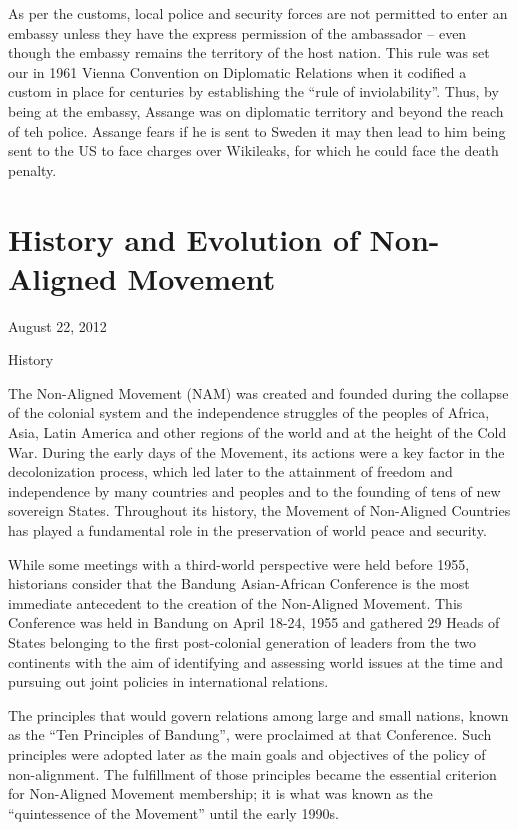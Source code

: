 \documentclass[
  openany]{book}
\begin{document}
As per the customs, local police and security forces are not permitted to enter an embassy unless they have the express permission of the ambassador -- even though the embassy remains the territory of the host nation. This rule was set our in 1961 Vienna Convention on Diplomatic Relations when it codified a custom in place for centuries by establishing the ``rule of inviolability''. Thus, by being at the embassy, Assange was on diplomatic territory and beyond the reach of teh police. Assange fears if he is sent to Sweden it may then lead to him being sent to the US to face charges over Wikileaks, for which he could face the death penalty.

\hypertarget{history-and-evolution-of-non-aligned-movement}{%
\section{History and Evolution of Non-Aligned Movement}\label{history-and-evolution-of-non-aligned-movement}}

August 22, 2012

History

The Non-Aligned Movement (NAM) was created and founded during the collapse of the colonial system and the independence struggles of the peoples of Africa, Asia, Latin America and other regions of the world and at the height of the Cold War. During the early days of the Movement, its actions were a key factor in the decolonization process, which led later to the attainment of freedom and independence by many countries and peoples and to the founding of tens of new sovereign States. Throughout its history, the Movement of Non-Aligned Countries has played a fundamental role in the preservation of world peace and security.

While some meetings with a third-world perspective were held before 1955, historians consider that the Bandung Asian-African Conference is the most immediate antecedent to the creation of the Non-Aligned Movement. This Conference was held in Bandung on April 18-24, 1955 and gathered 29 Heads of States belonging to the first post-colonial generation of leaders from the two continents with the aim of identifying and assessing world issues at the time and pursuing out joint policies in international relations.

The principles that would govern relations among large and small nations, known as the ``Ten Principles of Bandung'', were proclaimed at that Conference. Such principles were adopted later as the main goals and objectives of the policy of non-alignment. The fulfillment of those principles became the essential criterion for Non-Aligned Movement membership; it is what was known as the ``quintessence of the Movement'' until the early 1990s.
\end{document}

